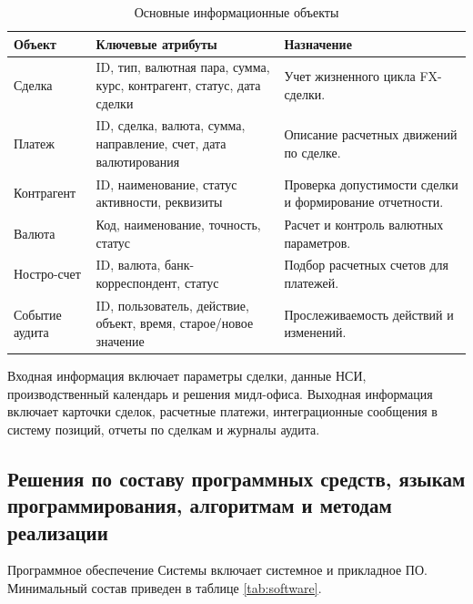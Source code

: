 \documentclass[a4paper,14pt]{extarticle}
\begin{document}
\begin{table}[H]
\centering
\small
\caption{Основные информационные объекты}
\label{tab:data}
\begin{tabularx}{\linewidth}{|L{35mm}|L{50mm}|X|}
\hline
\textbf{Объект} & \textbf{Ключевые атрибуты} & \textbf{Назначение} \\
\hline
Сделка & ID, тип, валютная пара, сумма, курс, контрагент, статус, дата сделки & Учет жизненного цикла FX-сделки. \\
\hline
Платеж & ID, сделка, валюта, сумма, направление, счет, дата валютирования & Описание расчетных движений по сделке. \\
\hline
Контрагент & ID, наименование, статус активности, реквизиты & Проверка допустимости сделки и формирование отчетности. \\
\hline
Валюта & Код, наименование, точность, статус & Расчет и контроль валютных параметров. \\
\hline
Ностро-счет & ID, валюта, банк-корреспондент, статус & Подбор расчетных счетов для платежей. \\
\hline
Событие аудита & ID, пользователь, действие, объект, время, старое/новое значение & Прослеживаемость действий и изменений. \\
\hline
\end{tabularx}
\end{table}

Входная информация включает параметры сделки, данные НСИ, производственный календарь и решения мидл-офиса. Выходная информация включает карточки сделок, расчетные платежи, интеграционные сообщения в систему позиций, отчеты по сделкам и журналы аудита.

\subsection{Решения по составу программных средств, языкам программирования, алгоритмам и методам реализации}
Программное обеспечение Системы включает системное и прикладное ПО. Минимальный состав приведен в таблице \ref{tab:software}.
\end{document}
